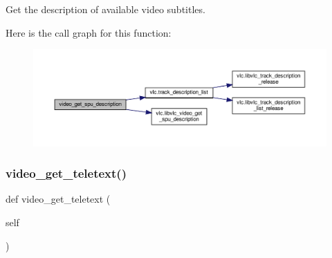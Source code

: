 \begin{DoxyVerb}Get the description of available video subtitles.
\end{DoxyVerb}
 Here is the call graph for this function\+:
\nopagebreak
\begin{figure}[H]
\begin{center}
\leavevmode
\includegraphics[width=350pt]{classvlc_1_1_media_player_a80f66276b0f1860d19dd5d771e7db936_cgraph}
\end{center}
\end{figure}
\mbox{\label{classvlc_1_1_media_player_a555e37de8f91b1de2d6991bfc19d01b2}} 
\subsubsection{\texorpdfstring{video\+\_\+get\+\_\+teletext()}{video\_get\_teletext()}}
{\footnotesize\ttfamily def video\+\_\+get\+\_\+teletext (\begin{DoxyParamCaption}\item[{}]{self }\end{DoxyParamCaption})}

